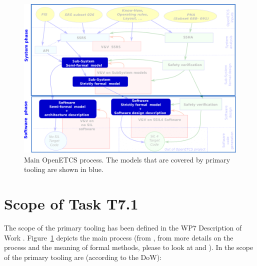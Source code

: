  \begin{figure}[b!]
  \centering
  \includegraphics[scale=0.45]{images/WholeProcess.png}
  \caption{Main OpenETCS process.  The models that are covered by primary tooling are shown in blue.}
  \label{fig:main_process}
\end{figure}


\section{Scope of Task T7.1}

The scope of the primary tooling has been defined in the WP7 Description of Work \citep{WP7_D01}.  Figure~\ref{fig:main_process} depicts the main process (from \citep{D2_3}, from more details on the process and the meaning of formal methods, please to look at \citep{D2_3} and \citep{D2_4}).  In the scope of the primary tooling are (according to the DoW):

